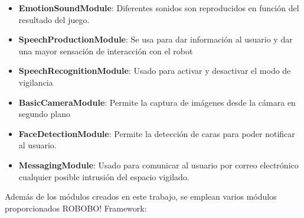 \begin{itemize}
	\item \textbf{EmotionSoundModule}: Diferentes sonidos son reproducidos en función del resultado del juego.
	\item \textbf{SpeechProductionModule}: Se usa para dar información al usuario y dar una mayor sensación de interacción con el robot
	\item \textbf{SpeechRecognitionModule}: Usado para activar y desactivar el modo de vigilancia
	\item \textbf{BasicCameraModule}: Permite la captura de imágenes desde la cámara en segundo plano
	\item \textbf{FaceDetectionModule}: Permite la detección de caras para poder notificar al usuario.
	\item \textbf{MessagingModule}: Usado para comunicar al usuario por correo electrónico cualquier posible intrusión del espacio vigilado.
\end{itemize}

Además de los módulos creados en este trabajo, se emplean varios módulos proporcionados ROBOBO! Framework:


